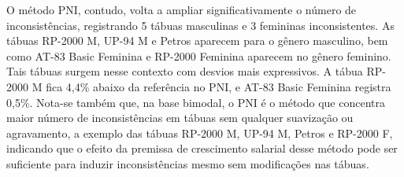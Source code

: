 O método PNI, contudo, volta a ampliar significativamente o número de inconsistências, registrando 5 tábuas masculinas e 3 femininas inconsistentes. As tábuas RP-2000 M, UP-94 M e Petros aparecem para o gênero masculino, bem como AT-83 Basic Feminina e RP-2000 Feminina aparecem no gênero feminino. Tais tábuas surgem nesse contexto com desvios mais expressivos. A tábua RP-2000 M fica 4,4\% abaixo da referência no PNI, e AT-83 Basic Feminina registra 0,5\%. Nota-se também que, na base bimodal, o PNI é o método que concentra maior número de inconsistências em tábuas sem qualquer suavização ou agravamento, a exemplo das tábuas RP-2000 M, UP-94 M, Petros e RP-2000 F, indicando que o efeito da premissa de crescimento salarial desse método pode ser suficiente para induzir inconsistências mesmo sem modificações nas tábuas.

